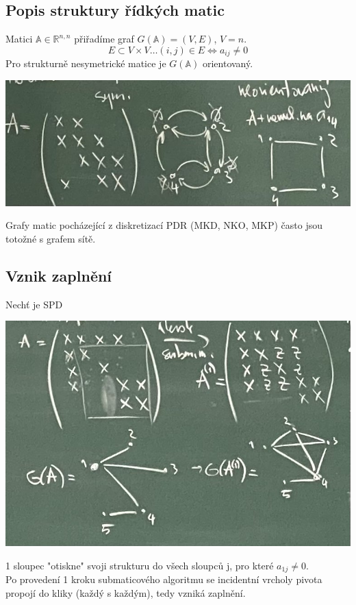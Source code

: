 \documentclass[../main.tex]{subfiles}
\begin{document}
\subsection{Popis struktury řídkých matic}
Matici $\mathbb{A}\in\mathbb{R}^{n,n}$ přiřadíme graf $G(\mathbb{A}) = (V,E)$, $V=\hat{n}$.\\
\begin{equation*}
    E\subset V\times V \dots (i,j)\in E \Leftrightarrow a_{ij} \neq 0 
\end{equation*}
Pro strukturně nesymetrické matice je $G(\mathbb{A})$ orientovaný.

\begin{center}
    \includegraphics[width=0.5\linewidth]{images/12-10-definice-pridruzeneho-grafu.jpg}
\end{center}

\begin{remark}
    Grafy matic pocházející z diskretizací PDR (MKD, NKO, MKP) často jsou totožné s grafem sítě. 
\end{remark}


\subsection{Vznik zaplnění}
Nechť \matA je SPD
\begin{center}
    \includegraphics[width=0.5\linewidth]{images/12-10-matice-s-pridruzenym-grafem.jpg}
\end{center}

1 sloupec "otiskne" svoji strukturu do všech sloupců j, pro které $a_{1j}\neq0$.\\
Po provedení 1 kroku submaticového algoritmu se incidentní vrcholy pivota propojí do kliky (každý s každým), tedy vzniká zaplnění.
\end{document}
